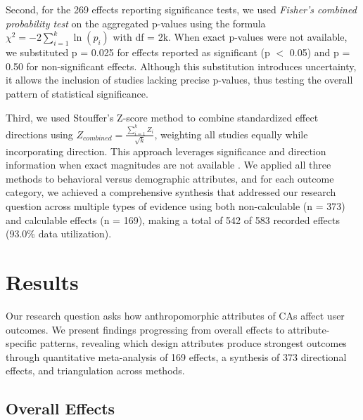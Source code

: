 \documentclass[lettersize,journal]{IEEEtran}
\begin{document}
Second, for the 269 effects reporting significance tests, we used \textit{Fisher's combined probability test} \cite{fisher1932statistical} on the aggregated p-values using the formula $\chi^2 = -2\sum_{i=1}^{k} \ln(p_i)$ with df = 2k. When exact p-values were not available, we substituted p = 0.025 for effects reported as significant (p $<$ 0.05) and p = 0.50 for non-significant effects. Although this substitution introduces uncertainty, it allows the inclusion of studies lacking precise p-values, thus testing the overall pattern of statistical significance. %

Third, we used Stouffer's Z-score method \cite{whitlock2005combining} to combine standardized effect directions using $Z_{combined} = \frac{\sum_{i=1}^{k} Z_i}{\sqrt{k}}$, weighting all studies equally while incorporating direction. This approach leverages significance and direction information when exact magnitudes are not available \cite{whitlock2005combining}.
We applied all three methods to behavioral versus demographic attributes, and for each outcome category, we achieved a comprehensive synthesis that addressed our research question across multiple types of evidence using both  %
non-calculable (n = 373) and calculable effects (n = 169), making a total of 542 of 583 recorded effects (93.0\% data utilization). 

\section{Results}

Our research question asks how anthropomorphic attributes of CAs affect user outcomes. We present findings progressing from overall effects to attribute-specific patterns, revealing which design attributes produce strongest outcomes through quantitative meta-analysis of 169 effects, a synthesis of 373 directional effects, and triangulation across methods.

\subsection{Overall Effects}
\end{document}
